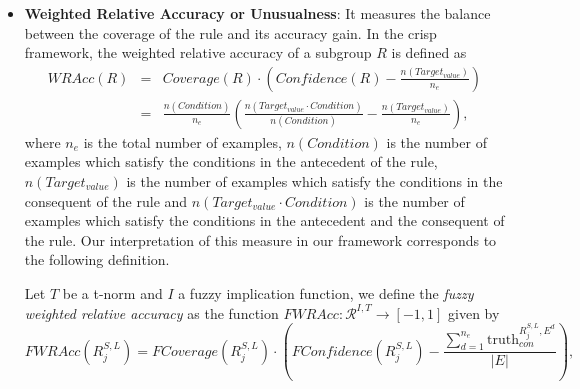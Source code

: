 \begin{itemize}
	\item \textbf{Weighted Relative Accuracy or Unusualness}: It measures the balance between the coverage of the rule and its accuracy gain. In the crisp framework, the weighted relative accuracy of a subgroup $R$ is defined as
	\begin{eqnarray*}
	WRAcc(R) &=& Coverage(R) \cdot \left(Confidence(R)-\frac{n(Target_{value})}{n_e}\right)\\
	&=& \frac{n(Condition)}{n_e} \left( \frac{n(Target_{value} \cdot Condition)}{n(Condition)} - \frac{n(Target_{value})}{n_e}\right),
	\end{eqnarray*}
	where  $n_e$ is the total number of examples, $n(Condition)$ is the number of examples which satisfy the conditions in the antecedent of the rule, $n(Target_{value})$ is the number of examples which satisfy the conditions in the consequent of the rule and $n(Target_{value} \cdot Condition)$ is the number of examples which satisfy the conditions in the antecedent and the consequent of the rule. Our interpretation of this measure in our framework corresponds to the following definition.
	\begin{definition}
		Let $T$ be a t-norm and $I$ a fuzzy implication function, we define the \emph{fuzzy weighted relative accuracy} as the function $FWRAcc : \mathcal{R}^{I,T} \to [-1,1]$ given by 
		$$
		FWRAcc(R^{S,L}_j) = FCoverage(R^{S,L}_j) \cdot \left(FConfidence(R^{S,L}_j) - \frac{\displaystyle \sum_{d=1}^{n_e}\text{truth}_{con}^{R^{S,L}_j,E^d}}{|E|}\right), 
$$
\end{definition}
\end{itemize}
